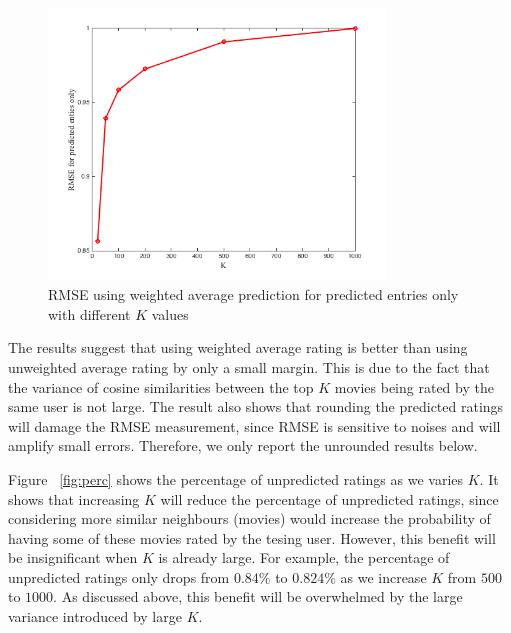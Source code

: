 \begin{figure}[!ht]
  \centering \includegraphics[width=0.8\textwidth]{images/rmsep.png}
  \caption{RMSE using weighted average prediction for predicted entries
    only with different $K$ values}
  \label{fig:rmsepred}
\end{figure}

The results suggest that using weighted average rating is better than
using unweighted average rating by only a small margin. This is due to
the fact that the variance of cosine similarities between the top $K$
movies being rated by the same user is not large. The result also
shows that rounding the predicted ratings will damage the RMSE
measurement, since RMSE is sensitive to noises and will amplify small
errors. Therefore, we only report the unrounded results below.


Figure ~\ref{fig:perc} shows the percentage of unpredicted ratings as
we varies $K$. It shows that increasing $K$ will reduce the percentage
of unpredicted ratings, since considering more similar neighbours
(movies) would increase the probability of having some of these movies
rated by the tesing user. However, this benefit will be insignificant
when $K$ is already large. For example, the percentage of unpredicted
ratings only drops from $0.84\%$ to $0.824\%$ as we increase $K$ from
$500$ to $1000$. As discussed above, this benefit will be overwhelmed
by the large variance introduced by large $K$.

